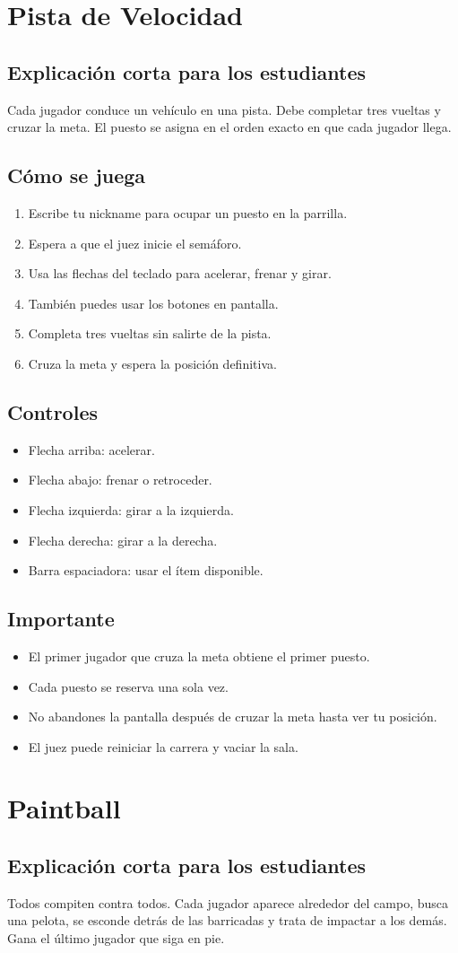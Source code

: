 \documentclass[12pt,a4paper]{article}
\newcommand{\juego}[1]{\section{#1}}
\newcommand{\subtitulo}[1]{\subsection*{#1}}
\begin{document}
\juego{Pista de Velocidad}

\subtitulo{Explicación corta para los estudiantes}
\begin{tcolorbox}[colback=gris,colframe=azul]
Cada jugador conduce un vehículo en una pista. Debe completar tres vueltas y cruzar la meta. El puesto se asigna en el orden exacto en que cada jugador llega.
\end{tcolorbox}

\subtitulo{Cómo se juega}
\begin{enumerate}
  \item Escribe tu nickname para ocupar un puesto en la parrilla.
  \item Espera a que el juez inicie el semáforo.
  \item Usa las flechas del teclado para acelerar, frenar y girar.
  \item También puedes usar los botones en pantalla.
  \item Completa tres vueltas sin salirte de la pista.
  \item Cruza la meta y espera la posición definitiva.
\end{enumerate}

\subtitulo{Controles}
\begin{itemize}
  \item Flecha arriba: acelerar.
  \item Flecha abajo: frenar o retroceder.
  \item Flecha izquierda: girar a la izquierda.
  \item Flecha derecha: girar a la derecha.
  \item Barra espaciadora: usar el ítem disponible.
\end{itemize}

\subtitulo{Importante}
\begin{itemize}
  \item El primer jugador que cruza la meta obtiene el primer puesto.
  \item Cada puesto se reserva una sola vez.
  \item No abandones la pantalla después de cruzar la meta hasta ver tu posición.
  \item El juez puede reiniciar la carrera y vaciar la sala.
\end{itemize}

\juego{Paintball}

\subtitulo{Explicación corta para los estudiantes}
\begin{tcolorbox}[colback=gris,colframe=verde]
Todos compiten contra todos. Cada jugador aparece alrededor del campo, busca una pelota, se esconde detrás de las barricadas y trata de impactar a los demás. Gana el último jugador que siga en pie.
\end{tcolorbox}
\end{document}
